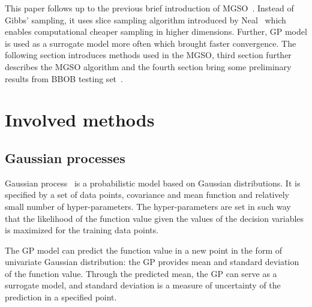 \documentclass{itatnew}
\begin{document}
This paper follows up to the previous brief introduction of MGSO~\cite{bajer_model_2013}. Instead of Gibbs' sampling, it uses slice sampling algorithm introduced by Neal~\cite{neal_slice_2003} which enables computational cheaper sampling in higher dimensions. Further, GP model is used as a surrogate model more often which brought faster convergence. The following section introduces methods used in the MGSO, third section further describes the MGSO algorithm and the fourth section bring some preliminary results from BBOB testing set~\cite{hansen_real_2009}.


\section{Involved methods}

\subsection{Gaussian processes}

Gaussian process~\cite{rasmussen_gaussian_2006} is a probabilistic model based on Gaussian distributions. It is specified by a set of data points, covariance and mean function and relatively small number of hyper-parameters. The hyper-parameters are set in such way that the likelihood of the function value given the values of the decision variables is maximized for the training data points.

The GP model can predict the function value in a new point in the form of univariate Gaussian distribution: the GP provides mean and standard deviation of the function value. Through the predicted mean, the GP can serve as a surrogate model, and standard deviation is a measure of uncertainty of the prediction in a specified point.
\end{document}
